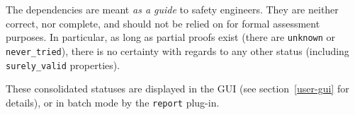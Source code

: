 \begin{important}
The dependencies are meant \emph{as a guide} to safety engineers. They are
neither correct, nor complete, and should not be relied on for formal
assessment purposes. In particular, as long as partial proofs exist (there are
\verb+unknown+ or \verb+never_tried+), there is no certainty with regards to
any other status (including \verb+surely_valid+ properties).
\end{important}

These consolidated statuses are displayed in the GUI (see
section~\ref{user-gui} for details), or in batch  mode by the \verb+report+
plug-in.



